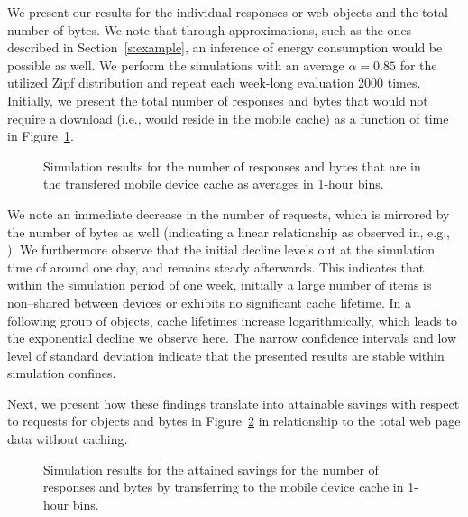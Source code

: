 We present our results for the individual responses or web objects and the total number of bytes.
We note that through approximations, such as the ones described in Section~\ref{s:example}, an inference of energy consumption would be possible as well.
We perform the simulations with an average $\alpha=0.85$ for the utilized Zipf distribution and repeat each week-long evaluation 2000 times.
Initially, we present the total number of responses and bytes that would not require a download (i.e., would reside in the mobile cache) as a function of time in Figure~\ref{fig:sim1}.
\begin{figure}[h!]
	\centering
	\qquad
	\caption{Simulation results for the number of responses and bytes that are in the transfered mobile device cache as averages in 1-hour bins.}
	\label{fig:sim1}
\end{figure}

We note an immediate decrease in the number of requests, which is mirrored by the number of bytes as well (indicating a linear relationship as observed in, e.g., \cite{JoSe14Commag}).
We furthermore observe that the initial decline levels out at the simulation time of around one day, and  remains steady afterwards.
This indicates that within the simulation period of one week, initially a large number of items is non--shared between devices or exhibits no significant cache lifetime. 
In a following group of objects, cache lifetimes increase logarithmically, which leads to the exponential decline we observe here.
The narrow confidence intervals and low level of standard deviation indicate that the presented results are stable within simulation confines.

Next, we present how these findings translate into attainable savings with respect to requests for objects and bytes in Figure~\ref{fig:sim2} in relationship to the total web page data without caching.
\begin{figure}[]
	\centering
	\qquad
	\caption{Simulation results for the attained savings for the number of responses and bytes by transferring to the mobile device cache in 1-hour bins.}
	\label{fig:sim2}
\end{figure}

